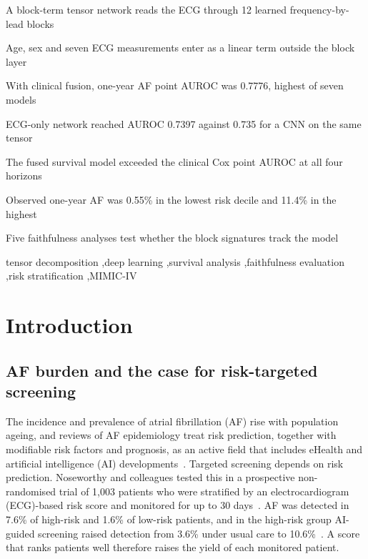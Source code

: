 \documentclass[preprint,12pt]{elsarticle}
\begin{document}
\begin{frontmatter}
\begin{abstract}
\end{abstract}

\begin{highlights}
\item A block-term tensor network reads the ECG through 12 learned frequency-by-lead blocks
\item Age, sex and seven ECG measurements enter as a linear term outside the block layer
\item With clinical fusion, one-year AF point AUROC was 0.7776, highest of seven models
\item ECG-only network reached AUROC 0.7397 against 0.735 for a CNN on the same tensor
\item The fused survival model exceeded the clinical Cox point AUROC at all four horizons
\item Observed one-year AF was 0.55\% in the lowest risk decile and 11.4\% in the highest
\item Five faithfulness analyses test whether the block signatures track the model
\end{highlights}

\begin{keyword}
tensor decomposition \sep deep learning \sep survival analysis \sep faithfulness evaluation \sep risk stratification \sep MIMIC-IV
\end{keyword}

\end{frontmatter}

\section{Introduction}

\subsection{AF burden and the case for risk-targeted screening}

The incidence and prevalence of atrial fibrillation (AF) rise with population ageing, and reviews of AF epidemiology treat risk prediction, together with modifiable risk factors and prognosis, as an active field that includes eHealth and artificial intelligence (AI) developments~\cite{kornej2020}. Targeted screening depends on risk prediction. Noseworthy and colleagues tested this in a prospective non-randomised trial of 1,003 patients who were stratified by an electrocardiogram (ECG)-based risk score and monitored for up to 30 days~\cite{noseworthy2022}. AF was detected in 7.6\% of high-risk and 1.6\% of low-risk patients, and in the high-risk group AI-guided screening raised detection from 3.6\% under usual care to 10.6\%~\cite{noseworthy2022}. A score that ranks patients well therefore raises the yield of each monitored patient.
\end{document}
